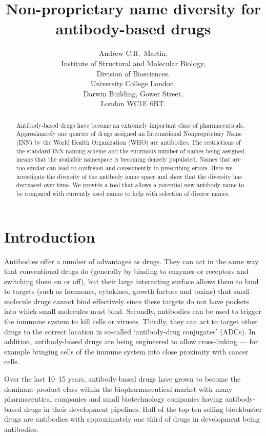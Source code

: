 \documentclass{article}
\title{Non-proprietary name diversity for antibody-based drugs}
\author{Andrew C.R.\ Martin,\\Institute of Structural and Molecular
  Biology,\\Division of Biosciences,\\University College
  London,\\Darwin Building, Gower Street,\\London WC1E 6BT.}
\begin{document}
\maketitle

\begin{abstract}
Antibody-based drugs have become an extremely important class of
pharmaceuticals. Approximately one quarter of drugs assigned an
International Nonproprietary Name (INN) by the World Health
Organization (WHO) are antibodies.  The restrictions of the standard
INN naming scheme and the enormous number of names being assigned,
means that the available namespace is becoming densely populated.
Names that are too similar can lead to confusion and consequently to
prescribing errors. Here we investigate the diversity of the antibody
name space and show that the diversity has decreased over time. We
provide a tool that allows a potential new antibody name to be
compared with currently used names to help with selection of diverse
names.
\end{abstract}

\section{Introduction}
Antibodies offer a number of advantages as drugs. They can act in the
same way that conventional drugs do (generally by binding to enzymes
or receptors and switching them on or off), but their large
interacting surface allows them to bind to targets (such as hormones,
cytokines, growth factors and toxins) that small molecule drugs cannot
bind effectively since these targets do not have pockets into which small
molecules must bind. Secondly, antibodies can be used to trigger the
iummune system to kill cells or viruses. Thirdly, they can act to
target other drugs to the correct location in so-called `antibody-drug
conjugates' (ADCs). In addition, antibody-based drugs are being
engineered to allow cross-linking --- for example bringing cells of
the immune system into close proximity with cancer cells.

Over the last 10--15 years, antibody-based drugs have grown to become
the dominant product class within the biopharmaceutical
market\cite{ecker:abmarket} with many pharmaceutical companies and
small biotechnology companies having antibody-based drugs in their
development pipelines. Half of the top ten selling blockbuster drugs
are antibodies\cite{igea:top10:2018} with approximately one third of
drugs in development being antibodies\cite{reichert:trends}.
\end{document}
